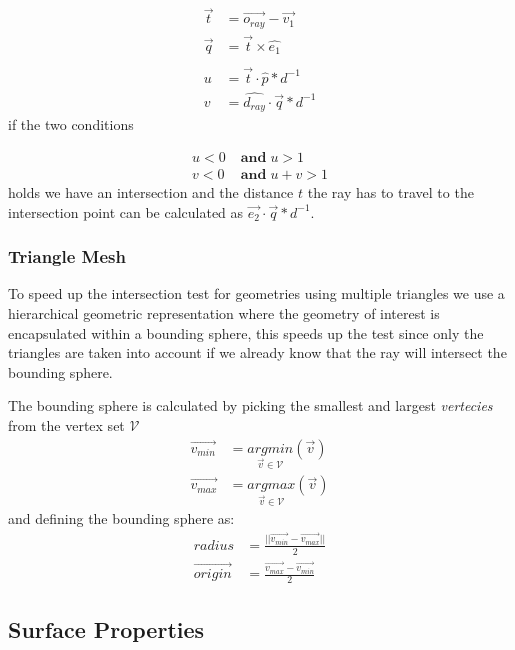 \documentclass[a4paper, twocolumn]{article}
\begin{document}
\begin{align*}
    \vec{t} &= \vec{o_{ray}} - \vec{v_1} \\
    \vec{q} &= \vec{t} \times \hat{e_1} \\\\
    u &= \vec{t} \cdot \hat{p} * d^{-1} \\
    v &= \hat{d_{ray}} \cdot \vec{q} * d^{-1}
\end{align*} 
if the two conditions
 
\begin{align*}
    u < 0 \; &\textbf{and} \; u > 1 \\
    v < 0 \; &\textbf{and}  \; u + v > 1 
\end{align*}
holds we have an intersection and the distance \(t\) the ray has to travel to the intersection point can be calculated as \(\vec{e_2} \cdot \vec{q} * d^{-1} \).

        
        \subsubsection{Triangle Mesh} \label{sec:triangle_mesh}
        
        To speed up the intersection test for geometries using multiple triangles we use a hierarchical geometric representation where the geometry of interest is encapsulated within a bounding sphere, this speeds up the test since only the triangles are taken into account if we already know that the ray will intersect the bounding sphere.

    The bounding sphere is calculated by picking the smallest and largest \textit{vertecies} from the vertex set \(\mathcal{V}\)
    \begin{align*} 
        \vec{v_{min}} &= \underset{\vec{v} \in \mathcal{V}}{argmin}(\vec{v}) \\
        \vec{v_{max}} &= \underset{\vec{v} \in \mathcal{V}}{argmax}(\vec{v})
    \end{align*}
    and defining the bounding sphere as:
    \begin{align*}
        radius &= \frac{ || \vec{v_{min}} - \vec{v_{max}} ||}{2} \\
        \vec{origin} &= \frac{\vec{v_{max}} - \vec{v_{min}}}{2}
    \end{align*}

        \subsection{Surface Properties} \label{sec:surface_properties}
\end{document}
